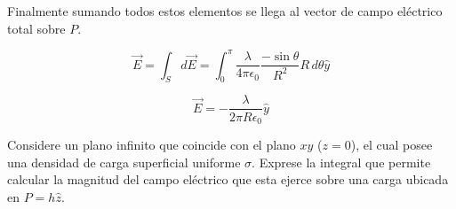 \documentclass[11pt]{article}
\begin{document}
\begin{solucion}
\begin{center}
        \shorthandon{>}
    \end{center}

    Finalmente sumando todos estos elementos se llega al vector de campo eléctrico total sobre $P$.

    \begin{equation}
        \vec{E} = \int_S d\vec{E} = \int_{0}^{\pi} \frac{\lambda}{4\pi\epsilon_0}\frac{-\sin{\theta}}{R^2}R\,d\theta \hat{y}
    \end{equation}

    \begin{equation}
        \vec{E} = -\frac{\lambda}{2\pi R\epsilon_0}\hat{y}
    \end{equation}

\end{solucion}

 Considere un plano infinito que coincide con el plano $xy$ ($z = 0$), el cual posee una densidad de carga superficial uniforme $\sigma$. Exprese la integral que permite calcular la magnitud del campo eléctrico que esta ejerce sobre una carga ubicada en $P=h\hat{z}$.
\end{document}

